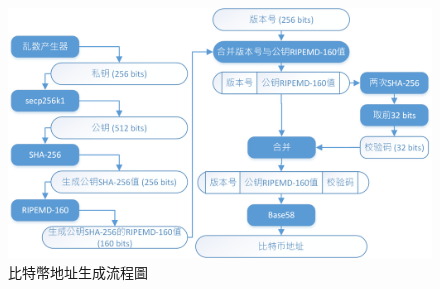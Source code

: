 			\begin{figure}[htbp]
					\centering
					\includegraphics[width = .9\textwidth]{address.png}
					\caption{比特幣地址生成流程圖}\label{address}
			\end{figure}

